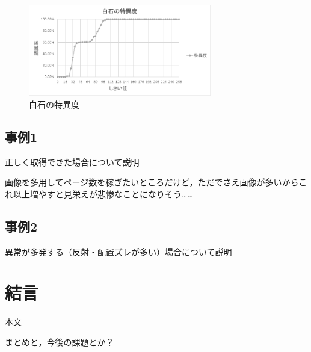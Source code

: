 \documentclass[openright]{nitocs}
\numberwithin{equation}{section}
\begin{document}
            \begin{figure} %
                \begin{center}
                \includegraphics[width=80mm,height=40mm]{White_TNF.eps} 
                \caption{白石の特異度}
                \label{White_TNF}
                \end{center}
            \end{figure}

        \subsection{事例1}
            正しく取得できた場合について説明

            画像を多用してページ数を稼ぎたいところだけど，ただでさえ画像が多いからこれ以上増やすと見栄えが悲惨なことになりそう……

        \subsection{事例2}
            異常が多発する（反射・配置ズレが多い）場合について説明

    \section{結言}\label{sec:Item} %
        本文

        まとめと，今後の課題とか？

            
            
\end{document}
